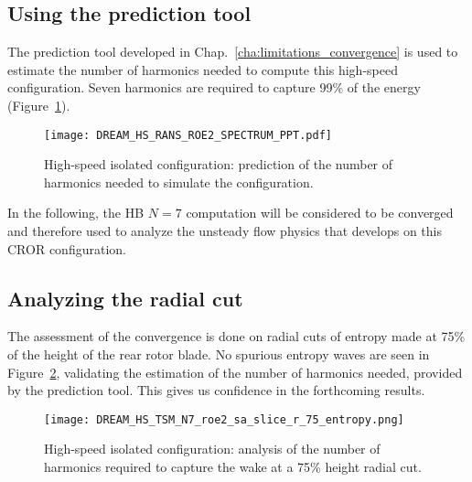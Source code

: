 
\subsection{Using the prediction tool}
\label{sub:dream_hs_conv_hb_prediction_tool}

The prediction tool developed in Chap.~\ref{cha:limitations_convergence}
is used to estimate the number of harmonics needed to compute
this high-speed configuration.
Seven harmonics are required to capture 99\% of the energy
(Figure~\ref{fig:DREAM_HS_RANS_ROE2_SPECTRUM_PPT}).
\begin{figure}[htp]
  \centering
  \texttt{[image: DREAM\_HS\_RANS\_ROE2\_SPECTRUM\_PPT.pdf]}
  \caption{High-speed isolated configuration: prediction of the number
  of harmonics needed to simulate the configuration.}
  \label{fig:DREAM_HS_RANS_ROE2_SPECTRUM_PPT}
\end{figure}

In the following, the HB $N=7$ computation will be
considered to be converged and therefore used to 
analyze the unsteady flow physics that develops on 
this CROR configuration.

\subsection{Analyzing the radial cut}
\label{sub:dream_hs_conv_hb_slice_r}

The assessment of the convergence is done on radial cuts
of entropy made at 75\% of the height of the rear rotor blade. 
No spurious entropy waves are seen
in Figure~\ref{fig:dream_hs_hb_slice_r_conv}, validating the
estimation of the number of harmonics needed, provided
by the prediction tool. This gives us confidence in the
forthcoming results.
\begin{figure}[htp]
  \centering
  \texttt{[image: DREAM\_HS\_TSM\_N7\_roe2\_sa\_slice\_r\_75\_entropy.png]}
  \caption{High-speed isolated configuration: analysis of the number of harmonics
  required to capture the wake at a 75\% height radial cut.}
  \label{fig:dream_hs_hb_slice_r_conv}
\end{figure}
